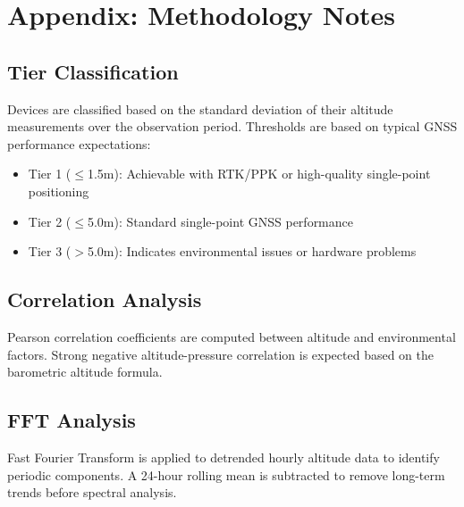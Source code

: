 \documentclass[11pt,a4paper]{article}
\begin{document}
\section{Appendix: Methodology Notes}

\subsection{Tier Classification}
Devices are classified based on the standard deviation of their altitude measurements over the observation period. Thresholds are based on typical GNSS performance expectations:
\begin{itemize}
    \item Tier 1 ($\leq$1.5m): Achievable with RTK/PPK or high-quality single-point positioning
    \item Tier 2 ($\leq$5.0m): Standard single-point GNSS performance
    \item Tier 3 ($>$5.0m): Indicates environmental issues or hardware problems
\end{itemize}

\subsection{Correlation Analysis}
Pearson correlation coefficients are computed between altitude and environmental factors. Strong negative altitude-pressure correlation is expected based on the barometric altitude formula.

\subsection{FFT Analysis}
Fast Fourier Transform is applied to detrended hourly altitude data to identify periodic components. A 24-hour rolling mean is subtracted to remove long-term trends before spectral analysis.
\end{document}
